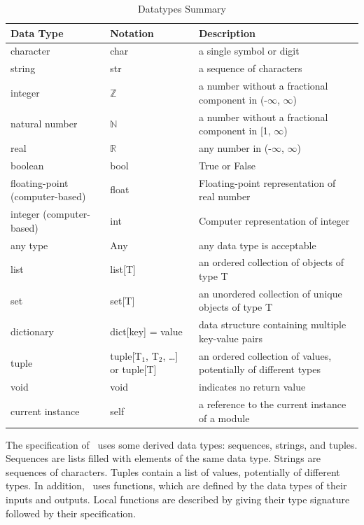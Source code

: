 \documentclass[12pt, titlepage]{article}
\begin{document}
\begin{table}[H]
\centering
\renewcommand{\arraystretch}{1.2}
\noindent 
\caption{Datatypes Summary}\label{TblDT}
\begin{tabular}{|>{\raggedright\arraybackslash}p{4cm}
                |>{\raggedright\arraybackslash}p{4cm}
                |>{\raggedright\arraybackslash}p{7.5cm}|}
\hline
\textbf{Data Type} & \textbf{Notation} & \textbf{Description}\\ 
\hline
character & char & a single symbol or digit\\
string & str & a sequence of characters\\
integer & $\mathbb{Z}$ & a number without a fractional component in (-$\infty$, $\infty$) \\
natural number & $\mathbb{N}$ & a number without a fractional component in [1, $\infty$) \\
real & $\mathbb{R}$ & any number in (-$\infty$, $\infty$)\\
boolean & bool & True or False\\
floating-point (computer-based) & float & Floating-point representation of real number\\
integer (computer-based) & int & Computer representation of integer\\
any type & Any & any data type is acceptable\\
list & list[T] & an ordered collection of objects of type T\\
set & set[T] & an unordered collection of unique objects of type T\\
dictionary & dict[key] = value & data structure containing multiple key-value pairs\\
tuple & tuple[T$_1$, T$_2$, \ldots] or tuple[T] & an ordered collection of values, potentially of different types\\
void & void & indicates no return value\\
current instance & self & a reference to the current instance of a module\\
\hline
\end{tabular}
\end{table}

\noindent
The specification of \progname \ uses some derived data types: sequences, strings, and
tuples. Sequences are lists filled with elements of the same data type. Strings
are sequences of characters. Tuples contain a list of values, potentially of
different types. In addition, \progname \ uses functions, which
are defined by the data types of their inputs and outputs. Local functions are
described by giving their type signature followed by their specification.
\end{document}
